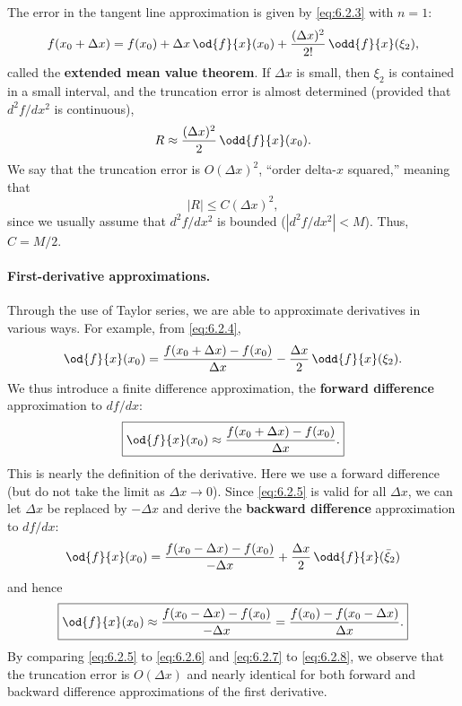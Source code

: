 \begin{example}
The error in the tangent line approximation is given by \eqref{eq:6.2.3} with $n = 1$:
\begin{equation}
f(x_0 + \Delta x) = f(x_0) + \Delta x\,\od{f}{x}(x_0) + \frac{(\Delta x)^2}{2!}\,\odd{f}{x}(\xi_2),
\label{eq:6.2.4}
\end{equation}
called the \textbf{extended mean value theorem}.  If $\Delta x$ is small, then $\xi_2$ is contained in a small interval, and the truncation error is almost determined (provided that $d^2f/dx^2$ is continuous),
\[
R \approx \frac{(\Delta x)^2}{2}\,\odd{f}{x}(x_0).
\]
We say that the truncation error is $O(\Delta x)^2$, ``order delta-$x$ squared,'' meaning that
\[
|R| \le C(\Delta x)^2,
\]
since we usually assume that $d^2f/dx^2$ is bounded ($|d^2f/dx^2| < M$).  Thus, $C = M/2$.
\end{example}

\paragraph{First-derivative approximations.}
Through the use of Taylor series, we are able to approximate derivatives in various ways.  For example, from \eqref{eq:6.2.4},
\begin{equation}
\od{f}{x}(x_0) = \frac{f(x_0 + \Delta x) - f(x_0)}{\Delta x} - \frac{\Delta x}{2}\,\odd{f}{x}(\xi_2).
\label{eq:6.2.5}
\end{equation}
We thus introduce a finite difference approximation, the \textbf{forward difference} approximation to $df/dx$:
\begin{equation}
\boxed{\od{f}{x}(x_0) \approx \frac{f(x_0 + \Delta x) - f(x_0)}{\Delta x}.}
\label{eq:6.2.6}
\end{equation}
This is nearly the definition of the derivative.  Here we use a forward difference (but do not take the limit as $\Delta x \to 0$).  Since \eqref{eq:6.2.5} is valid for all $\Delta x$, we can let $\Delta x$ be replaced by $-\Delta x$ and derive the \textbf{backward difference} approximation to $df/dx$:
\begin{equation}
\od{f}{x}(x_0) = \frac{f(x_0 - \Delta x) - f(x_0)}{-\Delta x} + \frac{\Delta x}{2}\,\odd{f}{x}(\bar{\xi}_2)
\label{eq:6.2.7}
\end{equation}
and hence
\begin{equation}
\boxed{\od{f}{x}(x_0) \approx \frac{f(x_0 - \Delta x) - f(x_0)}{-\Delta x} = \frac{f(x_0) - f(x_0 - \Delta x)}{\Delta x}.}
\label{eq:6.2.8}
\end{equation}
By comparing \eqref{eq:6.2.5} to \eqref{eq:6.2.6} and \eqref{eq:6.2.7} to \eqref{eq:6.2.8}, we observe that the truncation error is $O(\Delta x)$ and nearly identical for both forward and backward difference approximations of the first derivative.

